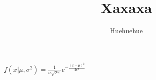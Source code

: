 \documentclass[12pt, a4paper, onecolumn, oneside, final]{article}
\title{Xaxaxa}
\author{Huehuehue}
\begin{document}

	$f(x | \mu, \sigma^2) = \frac{1}{\sigma \sqrt{2\pi}}e^{-\frac{(x-\mu)^2}{2\epsilon^2}}
	$
\end{document}
